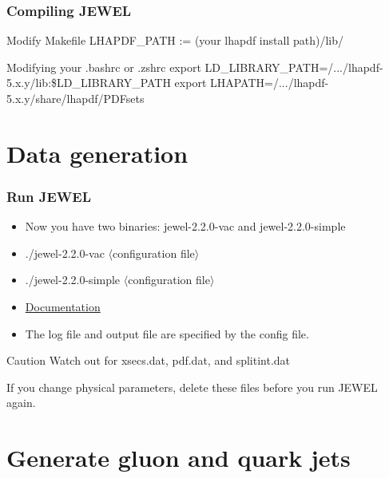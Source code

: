 \documentclass{beamer}
\begin{document}
\begin{frame}
 \frametitle{Compiling JEWEL}
 \begin{block}{Modify Makefile}
 LHAPDF\_PATH := (your lhapdf install path)/lib/
 \end{block}

 \begin{exampleblock}{Modifying your .bashrc or .zshrc}
 export LD\_LIBRARY\_PATH=/.../lhapdf-5.x.y/lib:\$LD\_LIBRARY\_PATH
 export LHAPATH=/.../lhapdf-5.x.y/share/lhapdf/PDFsets
 \end{exampleblock}
\end{frame}


\section{Data generation}
\begin{frame}
\frametitle{Run JEWEL}
\begin{itemize}
 \item Now you have two binaries: jewel-2.2.0-vac and jewel-2.2.0-simple
 \item ./jewel-2.2.0-vac $\langle$configuration file$\rangle$
 \item ./jewel-2.2.0-simple $\langle$configuration file$\rangle$
 \item \href{https://arxiv.org/pdf/1311.0048.pdf}{Documentation}
 \item The log file and output file are specified by the config file.
\end{itemize}

\begin{alertblock}{Caution}
Watch out for xsecs.dat, pdf.dat, and splitint.dat

If you change physical parameters, delete these files before you run JEWEL again.
\end{alertblock}



\end{frame}

\section{Generate gluon and quark jets}
\end{document}
